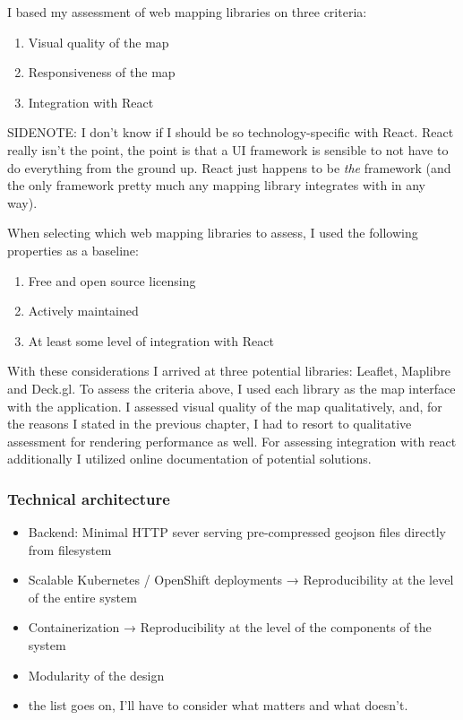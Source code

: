 I based my assessment of web mapping libraries on three criteria:
\begin{enumerate}
	\item Visual quality of the map
	\item Responsiveness of the map
	\item Integration with React
\end{enumerate}

SIDENOTE: I don't know if I should be so technology-specific with React.
React really isn't the point, the point is that a UI framework is sensible
to not have to do everything from the ground up. React just happens to
be \textit{the} framework
(and the only framework pretty much any mapping library integrates with in any way).

When selecting which web mapping libraries to assess, I used the following properties as a baseline:
\begin{enumerate}
	\item Free and open source licensing
	\item Actively maintained
	\item At least some level of integration with React
\end{enumerate}

With these considerations I arrived at three potential libraries:
Leaflet, Maplibre and Deck.gl.
To assess the criteria above,
I used each library as the map interface with the application.
I assessed visual quality of the map qualitatively, and, for the reasons I stated in the previous chapter,
I had to resort to qualitative assessment for rendering performance as well.
For assessing integration with react additionally I utilized online documentation of potential solutions.



\subsubsection{Technical architecture}

\begin{itemize}
	\item Backend: Minimal HTTP sever serving pre-compressed geojson files directly from filesystem
	\item Scalable Kubernetes / OpenShift deployments → Reproducibility at the level of the entire system
	\item Containerization → Reproducibility at the level of the components of the system
	\item Modularity of the design
	\item the list goes on, I'll have to consider what matters and what doesn't.
\end{itemize}


